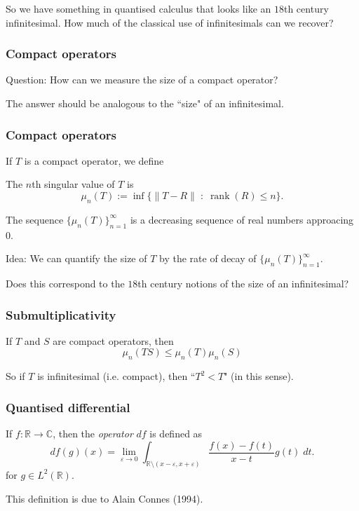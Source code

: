 \documentclass{beamer}
\newcommand{\Rl}{\mathbb{R}}
\newcommand{\Cplx}{\mathbb{C}}
\begin{document}
\begin{frame}
    So we have something in quantised calculus that looks
    like an $18$th century
    infinitesimal. How much of the classical use of infinitesimals
    can we recover?
\end{frame}

\begin{frame}
\frametitle{Compact operators}
\begin{block}
    {Question:}
    How can we measure the size of a compact operator?
\end{block}
The answer should be analogous to the ``size" of an infinitesimal.
\end{frame}

\begin{frame}
\frametitle{Compact operators}
If $T$ is a compact operator, we define
\begin{definition}
The $n$th singular value of $T$ is
\begin{equation*}
    \mu_n(T) := \inf\{\|T-R\|\;:\;\operatorname{rank}(R) \leq n\}.
\end{equation*}
\end{definition}
The sequence $\{\mu_n(T)\}_{n=1}^\infty$ is a decreasing sequence of 
real numbers approacing $0$.
\end{frame}

\begin{frame}
\begin{block}
{Idea:}
We can quantify the size of $T$ by the rate of decay of $\{\mu_n(T)\}_{n=1}^\infty$.
\end{block}
Does this correspond to the $18$th century notions of the size of an infinitesimal?
\end{frame}

\begin{frame}
\frametitle{Submultiplicativity}
\begin{theorem}
    If $T$ and $S$ are compact operators, then
    \begin{equation*}
        \mu_n(TS) \leq \mu_n(T)\mu_n(S)
    \end{equation*}
\end{theorem}
So if $T$ is infinitesimal (i.e. compact), then ``$T^2 < T$" (in this sense).
\end{frame}

\begin{frame}
\frametitle{Quantised differential}
\begin{definition}
    If $f:\Rl\rightarrow\Cplx$, then the \emph{operator}
    $df$ is defined as
    \begin{equation*}
        df(g)(x) = \lim_{\varepsilon\rightarrow 0}\int_{\Rl\setminus (x-\varepsilon,x+\varepsilon)} \frac{f(x)-f(t)}{x-t}g(t)\;dt.
    \end{equation*}
    for $g \in L^2(\Rl)$.
\end{definition}
This definition is due to Alain Connes (1994).
\end{frame}
\end{document}
